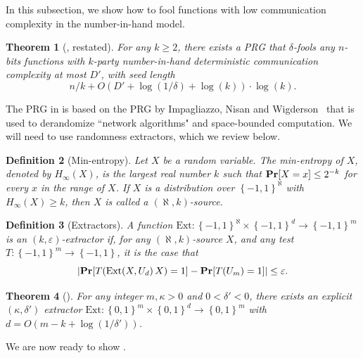\documentclass[10pt,a4paper]{article}
\newtheorem{theorem}{Theorem}
\newtheorem{definition}[theorem]{Definition}
\DeclareMathOperator*\Prob{{\bf Pr}}
\newcommand{\bool}{\left\{0,1\right\}}
\newcommand{\boolpm}{\left\{-1,1\right\}}
\newcommand{\EI}{\aleph}
\newcommand{\uniform}{U}
\newcommand{\prn}[1]{\left(#1\right)}
\newcommand{\cprn}[1]{\!\left(#1\right)}
\newcommand{\csqbra}[1]{\!\left[#1\right]}
\begin{document}
	In this subsection, we show how to fool functions with low communication complexity in the number-in-hand model.
    
	\begin{theorem}[\cite{ASWZ96,INW94},  restated]\label{lem:prg-lc-app}
		For any $k\geq 2$, there exists a PRG that $\delta$-fools any $n$-bits functions with $k$-party number-in-hand deterministic communication complexity at most $D'$, with seed length
		\[
			n/k+O\left(D' + \log(1/\delta)+\log(k)\right)\cdot\log(k).
		\]
	\end{theorem}
	
	The PRG in  is based on the PRG by Impagliazzo, Nisan and Wigderson~\cite{INW94} that is used to derandomize ``network algorithms" and space-bounded computation. We will need to use randomness extractors, which we review below.
	
	\begin{definition}[Min-entropy]
    	Let $X$ be a random variable. The \emph{min-entropy} of $X$, denoted by $H_\infty(X)$, is the largest real number $k$ such that $\Prob\csqbra{X=x}\leq2^{-k}$ for every $x$ in the range of $X$. If $X$ is a distribution over $\boolpm^\EI$ with $H_\infty\cprn{X}\geq k$, then $X$ is called a {\em$\prn{\EI,k}$-source}.
    \end{definition}
    
    \begin{definition}[Extractors]
    	A function $\mathrm{Ext}\colon\boolpm^\EI\times\boolpm^d\to\boolpm^m$ is an \emph{$(k,\varepsilon)$-extractor} if, for any $\prn{\EI,k}$-source $X$, and any test $T\colon\boolpm^m\to\boolpm$, it is the case that
    	\[
    	    \left|\Prob[T(\mathrm{Ext}\cprn{X,\uniform_d}X)=1]-\Prob[T(\uniform_m)=1]\right|\leq \varepsilon.
    	\]
    \end{definition}
	
    \begin{theorem}[{\cite[Theorem 6.22]{Vad12}}]\label{thm:prg-ext}
		For any integer $m,\kappa>0$ and $0<\delta'<0$, there exists an explicit $(\kappa,\delta')$ extractor $\mathrm{Ext}\colon\bool^{m}\times\bool^d\to\bool^{m}$ with $d=O(m-k+\log(1/\delta'))$.
	\end{theorem}

    We are now ready to show .
    
\end{document}
